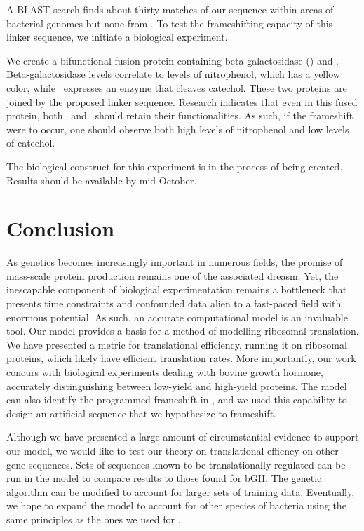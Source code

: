 \documentclass[12pt, draft]{article}
\numberwithin{equation}{section}
\begin{document}
A BLAST search finds about thirty matches of our sequence within areas of
bacterial genomes but none from \ecoli. To test the frameshifting capacity of
this linker sequence, we initiate a biological experiment.

We create a bifunctional fusion protein containing beta-galactosidase (\bgals) 
and \xylE.  Beta-galactosidase levels correlate to
levels of nitrophenol, which has a yellow color, while \xylE\ expresses
an enzyme that cleaves catechol.  These two proteins are joined by
the proposed linker sequence.  Research indicates that even in this
fused protein, both \bgals\ and \xylE\ should retain their functionalities.
As such, if the frameshift were to occur, one should observe both 
high levels of nitrophenol and low levels of catechol.

The biological construct for this experiment is in the process of being created.
Results should be available by mid-October.

\section{Conclusion}

As genetics becomes increasingly important in numerous fields, the
promise of mass-scale protein production remains one of the associated dreasm.
Yet, the inescapable
component of biological experimentation remains a bottleneck that
presents time constraints and confounded data
alien to a fast-paced field with enormous potential. As such, an
accurate computational model is an invaluable tool. 
Our model provides a basis for a method of modelling ribosomal translation.
We have presented a metric for translational efficiency, running it on
ribosomal proteins, which likely have efficient translation rates.
More importantly, our work concurs with biological experiments dealing with bovine growth hormone,
accurately distinguishing between low-yield and high-yield proteins.
The model can also identify the programmed frameshift in \prfB,
and we used this capability to design an artificial sequence that we hypothesize to frameshift.

Although we have presented a large amount of circumstantial evidence
to support our model, we would like to test our theory on translational effiency
on other gene sequences.  Sets of sequences known to be translationally regulated
can be run in the model to compare results to those found for bGH.
The genetic algorithm can be modified to account for larger sets of training
data.  Eventually, we hope to expand the model to account for other species of
bacteria using the same principles as the ones we used for \ecoli.
\end{document}

